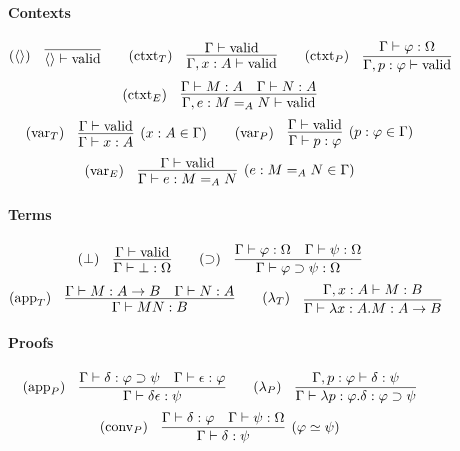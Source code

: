 \documentclass[a4paper,UKenglish]{lipics-v2016}
\newcommand*{\vald}{\ensuremath{\vdash \mathrm{valid}}}
\theoremstyle{plain}
\theoremstyle{definition}
\begin{document}
\newcommand{\RvarT}{\ensuremath(\mathsf{varT})}
\begin{figure}
\paragraph*{Contexts}
\[ (\langle \rangle) \quad \vcenter{\infer{\langle \rangle \vald}{}} \qquad
(\mathrm{ctxt}_T) \quad \vcenter{\infer{\Gamma, x : A \vald}{\Gamma \vald}} \qquad 
(\mathrm{ctxt}_P) \quad \vcenter{\infer{\Gamma, p : \varphi \vald}{\Gamma \vdash \varphi : \Omega}} \]
\[ (\mathrm{ctxt}_E) \quad \vcenter{\infer{\Gamma, e : M =_A N \vald}{\Gamma \vdash M : A \quad \Gamma \vdash N : A}} \]
\[ (\mathrm{var}_T) \quad \vcenter{\infer[(x : A \in \Gamma)]{\Gamma \vdash x : A}{\Gamma \vald}} \qquad
(\mathrm{var}_P) \quad \vcenter{\infer[(p : \varphi \in \Gamma)]{\Gamma \vdash p : \varphi}{\Gamma \vald}} \]
\[ (\mathrm{var}_E) \quad \vcenter{\infer[(e : M =_A N \in \Gamma)]{\Gamma \vdash e : M =_A N}{\Gamma \vald}} \]

\paragraph*{Terms}
\[ (\bot) \quad \vcenter{\infer{\Gamma \vdash \bot : \Omega}{\Gamma \vald}} \qquad
(\supset) \quad \vcenter{\infer{\Gamma \vdash \varphi \supset \psi : \Omega}{\Gamma \vdash \varphi : \Omega \quad \Gamma \vdash \psi : \Omega}} \]
\[ (\mathrm{app}_T) \quad \vcenter{\infer{\Gamma \vdash M N : B} {\Gamma \vdash M : A \rightarrow B \quad \Gamma \vdash N : A}} \qquad
(\lambda_T) \quad \vcenter{\infer{\Gamma \vdash \lambda x:A.M : A \rightarrow B}{\Gamma, x : A \vdash M : B}} \]

\paragraph*{Proofs}
\[ (\mathrm{app}_P) \quad \vcenter{\infer{\Gamma \vdash \delta \epsilon : \psi} {\Gamma \vdash \delta : \varphi \supset \psi \quad \Gamma \vdash \epsilon : \varphi}} \qquad
(\lambda_P) \quad \vcenter{\infer{\Gamma \vdash \lambda p : \varphi . \delta : \varphi \supset \psi}{\Gamma, p : \varphi \vdash \delta : \psi}} \]
\[ (\mathrm{conv}_P) \quad \vcenter{\infer[(\varphi \simeq \psi)]{\Gamma \vdash \delta : \psi}{\Gamma \vdash \delta : \varphi \quad \Gamma \vdash \psi : \Omega}} \]


\end{figure}
\end{document}
